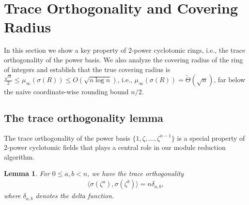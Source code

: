\documentclass[11pt,a4paper]{article}
\theoremstyle{plain}
\newtheorem{lemma}[theorem]{Lemma}
\theoremstyle{definition}
\theoremstyle{remark}
\begin{document}
\section{Trace Orthogonality and Covering Radius}\label{sec:orth}

In this section we show a key property of 2-power cyclotomic rings, i.e., the trace orthogonality of the power basis. We also analyze the covering radius of the ring of integers and establish that the true covering radius is $\tfrac{\sqrt n}{2}\le\mu_\infty(\sigma(R))\le O(\sqrt{n\log n})$, i.e., $\mu_\infty(\sigma(R))=\tilde\Theta(\sqrt n)$, far below the naive coordinate-wise rounding bound $n/2$. 

\subsection{The trace orthogonality lemma}\label{subsec:traceorth}

The trace orthogonality of the power basis $\{1,\zeta, \dots, \zeta^{n-1}\}$ is a special property of $2$-power cyclotomic fields that plays a central role in our module reduction algorithm.

\begin{lemma}\label{lem:orth}
For $0\le a, b < n$, we have the trace orthogonality 
\begin{align}
  \langle\sigma(\zeta^a),\sigma(\zeta^b)\rangle=n \delta_{a,b},
  \label{E:traceorth}
\end{align}
where $\delta_{a,b}$ denotes the delta function.

\end{lemma}
\end{document}
